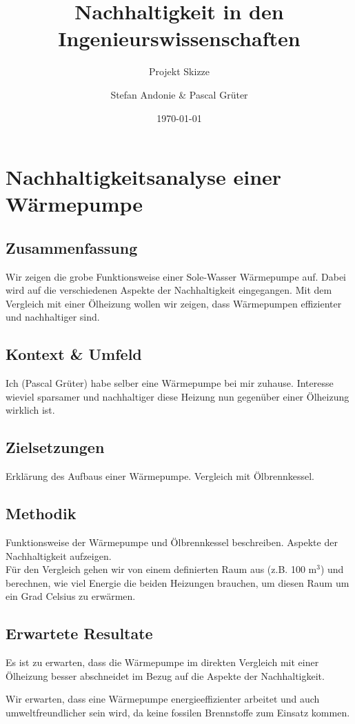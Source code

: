 \documentclass[10pt,paper=a4,final]{scrartcl}
\title{Nachhaltigkeit in den Ingenieurswissenschaften}
\subtitle{Projekt Skizze}
\author{Stefan Andonie \& Pascal Grüter}
\date{\today{}}
\begin{document}
\section*{Nachhaltigkeitsanalyse einer Wärmepumpe}

\subsection*{Zusammenfassung}

Wir zeigen die grobe Funktionsweise einer Sole-Wasser Wärmepumpe auf. Dabei wird auf die verschiedenen Aspekte der Nachhaltigkeit eingegangen. Mit dem Vergleich mit einer Ölheizung wollen wir zeigen, dass Wärmepumpen effizienter und nachhaltiger sind.

\subsection*{Kontext \& Umfeld}

Ich (Pascal Grüter) habe selber eine Wärmepumpe bei mir zuhause. Interesse wieviel sparsamer und nachhaltiger diese Heizung nun gegenüber einer Ölheizung wirklich ist.

\subsection*{Zielsetzungen}

Erklärung des Aufbaus einer Wärmepumpe.
Vergleich mit Ölbrennkessel.

\subsection*{Methodik}

Funktionsweise der Wärmepumpe und Ölbrennkessel beschreiben. Aspekte der Nachhaltigkeit aufzeigen. \\
Für den Vergleich gehen wir von einem definierten Raum aus (z.B. 100 m$^{3}$) und berechnen, wie viel Energie die beiden Heizungen brauchen, um diesen Raum um ein Grad Celsius zu erwärmen.

\subsection*{Erwartete Resultate}

  Es ist zu erwarten, dass die Wärmepumpe im direkten Vergleich mit einer
  Ölheizung besser abschneidet im Bezug auf die Aspekte der Nachhaltigkeit.
  
  Wir erwarten, dass eine Wärmepumpe energieeffizienter arbeitet und auch
  umweltfreundlicher sein wird, da keine fossilen Brennstoffe zum Einsatz kommen.
\end{document}
